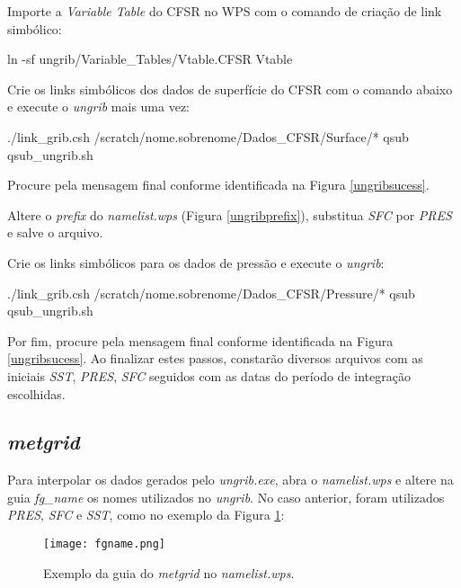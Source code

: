 \noindent Importe a \textit{Variable Table} do CFSR no WPS com o comando de criação de link simbólico:
\bigskip

\begin{bashcode}
ln -sf ungrib/Variable_Tables/Vtable.CFSR Vtable
\end{bashcode}
\bigskip

\noindent Crie os links simbólicos dos dados de superfície do CFSR com o comando abaixo e execute o \textit{ungrib} mais uma vez:
\bigskip

\begin{bashcode}
./link_grib.csh /scratch/nome.sobrenome/Dados_CFSR/Surface/*
qsub qsub_ungrib.sh
\end{bashcode}
\bigskip

\noindent Procure pela mensagem final conforme identificada na Figura \textcolor{bleu_cite}{\ref{ungribsucess}}.
\bigskip

\noindent Altere o \textit{prefix} do \textit{namelist.wps} (Figura \textcolor{bleu_cite}{\ref{ungribprefix}}), substitua \textit{SFC} por \textit{PRES} e salve o arquivo.
\bigskip

\noindent Crie os links simbólicos para os dados de pressão e execute o \textit{ungrib}:
\bigskip

\begin{bashcode}
./link_grib.csh /scratch/nome.sobrenome/Dados_CFSR/Pressure/*
qsub qsub_ungrib.sh
\end{bashcode}
\bigskip

\noindent Por fim, procure pela mensagem final conforme identificada na Figura \textcolor{bleu_cite}{\ref{ungribsucess}}. Ao finalizar estes passos, constarão diversos arquivos com as iniciais \textit{SST}, \textit{PRES}, \textit{SFC} seguidos com as datas do período de integração escolhidas.
\bigskip




\subsection{\textit{metgrid}}
\bigskip
\noindent Para interpolar os dados gerados pelo \textit{ungrib.exe},  abra o \textit{namelist.wps} e altere na guia \textit{fg\_name} os nomes utilizados no \textit{ungrib}. No caso anterior, foram utilizados \textit{PRES}, \textit{SFC} e \textit{SST}, como no exemplo da Figura \textcolor{bleu_cite}{\ref{fgname}}:
\bigskip

\begin{figure}[H]
    \centering
    \texttt{[image: fgname.png]}
    \caption{Exemplo da guia do \textit{metgrid} no \textit{namelist.wps}.}
    \label{fgname}
\end{figure}
\bigskip

